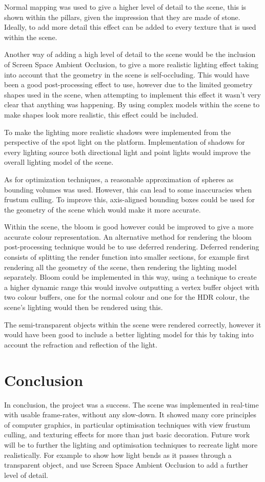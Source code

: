 \documentclass[conference]{acmsiggraph}
\begin{document}
Normal mapping was used to give a higher level of detail to the scene, this is shown within the pillars, given the impression that they are made of stone. Ideally, to add more detail this effect can be added to every texture that is used within the scene.

Another way of adding a high level of detail to the scene would be the inclusion of Screen Space Ambient Occlusion, to give a more realistic lighting effect taking into account that the geometry in the scene is self-occluding. This would have been a good post-processing effect to use, however due to the limited geometry shapes used in the scene, when attempting to implement this effect it wasn't very clear that anything was happening. By using complex models within the scene to make shapes look more realistic, this effect could be included.

To make the lighting more realistic shadows were implemented from the perspective of the spot light on the platform. Implementation of shadows for every lighting source both directional light and point lights would improve the overall lighting model of the scene.

As for optimization techniques, a reasonable approximation of spheres as bounding volumes was used. However, this can lead to some inaccuracies when frustum culling. To improve this, axis-aligned bounding boxes could be used for the geometry of the scene which would make it more accurate.

Within the scene, the bloom is good however could be improved to give a more accurate colour representation. An alternative method for rendering the bloom post-processing technique would be to use deferred rendering. Deferred rendering consists of splitting the render function into smaller sections, for example first rendering all the geometry of the scene, then rendering the lighting model separately. Bloom could be implemented in this way, using a technique to create a higher dynamic range this would involve outputting a vertex buffer object with two colour buffers, one for the normal colour and one for the HDR colour, the scene's lighting would then be rendered using this.

The semi-transparent objects within the scene were rendered correctly, however it would have been good to include a better lighting model for this by taking into account the refraction and reflection of the light.
	
\section{Conclusion}
In conclusion, the project was a success. The scene was implemented in real-time with usable frame-rates, without any slow-down. It showed many core principles of computer graphics, in particular optimisation techniques with view frustum culling, and texturing effects for more than just basic decoration. Future work will be to further the lighting and optimisation techniques to recreate light more realistically. For example to show how light bends as it passes through a transparent object, and use Screen Space Ambient Occlusion to add a further level of detail.


\end{document}
